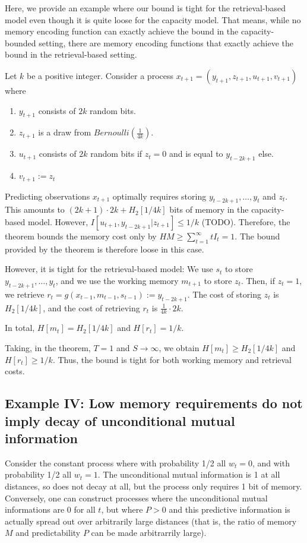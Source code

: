 \documentclass[11pt,letterpaper]{article}
\newcounter{theorem}
\begin{document}
Here, we provide an example where our bound is tight for the retrieval-based model even though it is quite loose for the capacity model.
That means, while no memory encoding function can exactly achieve the bound in the capacity-bounded setting, there are memory encoding functions that exactly achieve the bound in the retrieval-based setting.

Let $k$ be a positive integer.
Consider a process $x_{t+1} = (y_{t+1}, z_{t+1}, u_{t+1}, v_{t+1})$ where
\begin{enumerate}
    \item $y_{t+1}$ consists of $2k$ random bits.
    \item $z_{t+1}$ is a draw from $Bernoulli(\frac{1}{4k})$.
    \item $u_{t+1}$ consists of $2k$ random bits if $z_t = 0$ and is equal to $y_{t-2k+1}$ else.
    \item $v_{t+1} := z_t$ 
\end{enumerate}
Predicting observations $x_{t+1}$ optimally requires storing $y_{t-2k+1}, \dots, y_{t}$ and $z_t$.
This amounts to $(2k+1)\cdot 2k + H_2[1/4k]$ bits of memory in the capacity-based model.
However, $I[u_{t+1}, y_{t-2k+1}|z_{t+1}] \leq 1/k$ (TODO).
Therefore, the theorem bounds the memory cost only by $HM \geq \sum_{t=1}^\infty t I_t = 1$.
The bound provided by the theorem is therefore loose in this case.

However, it is tight for the retrieval-based model:
We use $s_t$ to store $y_{t-2k+1}, \dots, y_{t}$, and we use the working memory $m_{t+1}$ to store $z_t$.
Then, if $z_t = 1$, we retrieve $r_t = g(x_{t-1}, m_{t-1}, s_{t-1}) := y_{t-2k+1}$.
The cost of storing $z_t$ is $H_2[1/4k]$, and the cost of retrieving $r_t$ is $\frac{1}{4k} \cdot 2k$.



In total, $H[m_t] = H_2[1/4k]$ and $H[r_t] = 1/k$.

Taking, in the theorem, $T=1$ and $S\rightarrow\infty$, we obtain $H[m_t] \geq H_2[1/4k]$ and $H[r_t] \geq 1/k$.
Thus, the bound is tight for both working memory and retrieval costs.

\subsection{Example IV: Low memory requirements do not imply decay of unconditional mutual information}

Consider the constant process where with probability 1/2 all $w_t = 0$, and with probability 1/2 all $w_t = 1$. %
The unconditional mutual information is 1 at all distances, so does not decay at all, but the process only requires 1 bit of memory.
Conversely, one can construct processes where the unconditional mutual informations are 0 for all $t$, but where $P > 0$ and this predictive information is actually spread out over arbitrarily large distances (that is, the ratio of memory $M$ and predictability $P$ can be made arbitrarrily large).
\end{document}
